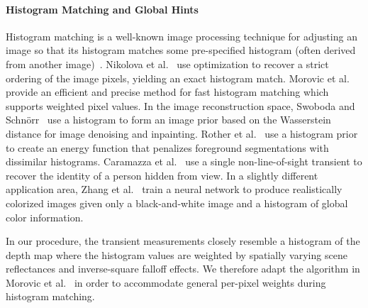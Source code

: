\paragraph{Histogram Matching and Global Hints}
%
Histogram matching is a well-known image processing technique for adjusting an
image so that its histogram matches some pre-specified histogram (often derived
from another image)~\cite{gonzales1977gray,Gonzalez2008}. Nikolova et
al.~\cite{Nikolova2013} use optimization to recover a strict ordering of the
image pixels, yielding an exact histogram match. Morovic et
al.~\cite{Morovic2002} provide an efficient and precise method for fast
histogram matching which supports weighted pixel values. In the image
reconstruction space, Swoboda and Schn\"orr~\cite{Swoboda2013} use a histogram
to form an image prior based on the Wasserstein distance for image denoising and
inpainting. Rother et al.~\cite{Rother2006} use a histogram prior to create an
energy function that penalizes foreground segmentations with dissimilar
histograms. Caramazza et al.~\cite{caramazza2018neural} use a single
non-line-of-sight transient to recover the identity of a person hidden from
view. In a slightly different application area, Zhang et
al.~\cite{Zhang2017} train a neural network to produce realistically colorized
images given only a black-and-white image and a histogram of global color
information.


In our procedure, the transient measurements closely resemble a histogram of
the depth map where the histogram values are weighted by spatially varying scene
reflectances and inverse-square falloff effects. We therefore adapt the
algorithm in Morovic et al.~\cite{Morovic2002} in order to accommodate general
per-pixel weights during histogram matching.


%


